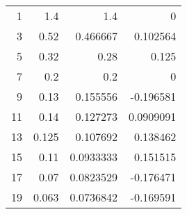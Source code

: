 \begin{tabular}{rrrr}
\hline
  1 & 1.4   & 1.4       &  0         \\
  3 & 0.52  & 0.466667  &  0.102564  \\
  5 & 0.32  & 0.28      &  0.125     \\
  7 & 0.2   & 0.2       &  0         \\
  9 & 0.13  & 0.155556  & -0.196581  \\
 11 & 0.14  & 0.127273  &  0.0909091 \\
 13 & 0.125 & 0.107692  &  0.138462  \\
 15 & 0.11  & 0.0933333 &  0.151515  \\
 17 & 0.07  & 0.0823529 & -0.176471  \\
 19 & 0.063 & 0.0736842 & -0.169591  \\
\hline
\end{tabular}